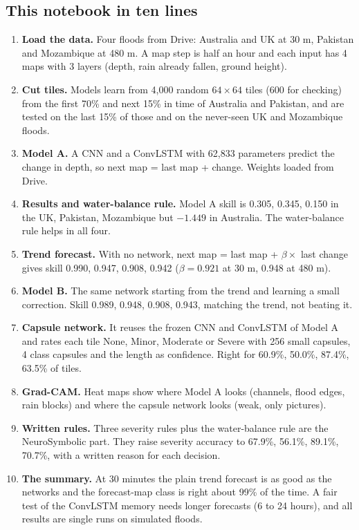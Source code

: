 \subsection{This notebook in ten lines}
\begin{enumerate}
\item \textbf{Load the data.} Four floods from Drive: Australia and UK at 30 m, Pakistan and Mozambique at 480 m. A map step is half an hour and each input has 4 maps with 3 layers (depth, rain already fallen, ground height).
\item \textbf{Cut tiles.} Models learn from 4,000 random $64\times64$ tiles (600 for checking) from the first 70\% and next 15\% in time of Australia and Pakistan, and are tested on the last 15\% of those and on the never-seen UK and Mozambique floods.
\item \textbf{Model A.} A CNN and a ConvLSTM with 62,833 parameters predict the change in depth, so next map = last map + change. Weights loaded from Drive.
\item \textbf{Results and water-balance rule.} Model A skill is 0.305, 0.345, 0.150 in the UK, Pakistan, Mozambique but $-1.449$ in Australia. The water-balance rule helps in all four.
\item \textbf{Trend forecast.} With no network, next map = last map + $\beta\times$ last change gives skill 0.990, 0.947, 0.908, 0.942 ($\beta=0.921$ at 30 m, 0.948 at 480 m).
\item \textbf{Model B.} The same network starting from the trend and learning a small correction. Skill 0.989, 0.948, 0.908, 0.943, matching the trend, not beating it.
\item \textbf{Capsule network.} It reuses the frozen CNN and ConvLSTM of Model A and rates each tile None, Minor, Moderate or Severe with 256 small capsules, 4 class capsules and the length as confidence. Right for 60.9\%, 50.0\%, 87.4\%, 63.5\% of tiles.
\item \textbf{Grad-CAM.} Heat maps show where Model A looks (channels, flood edges, rain blocks) and where the capsule network looks (weak, only pictures).
\item \textbf{Written rules.} Three severity rules plus the water-balance rule are the NeuroSymbolic part. They raise severity accuracy to 67.9\%, 56.1\%, 89.1\%, 70.7\%, with a written reason for each decision.
\item \textbf{The summary.} At 30 minutes the plain trend forecast is as good as the networks and the forecast-map class is right about 99\% of the time. A fair test of the ConvLSTM memory needs longer forecasts (6 to 24 hours), and all results are single runs on simulated floods.
\end{enumerate}
\endgroup
